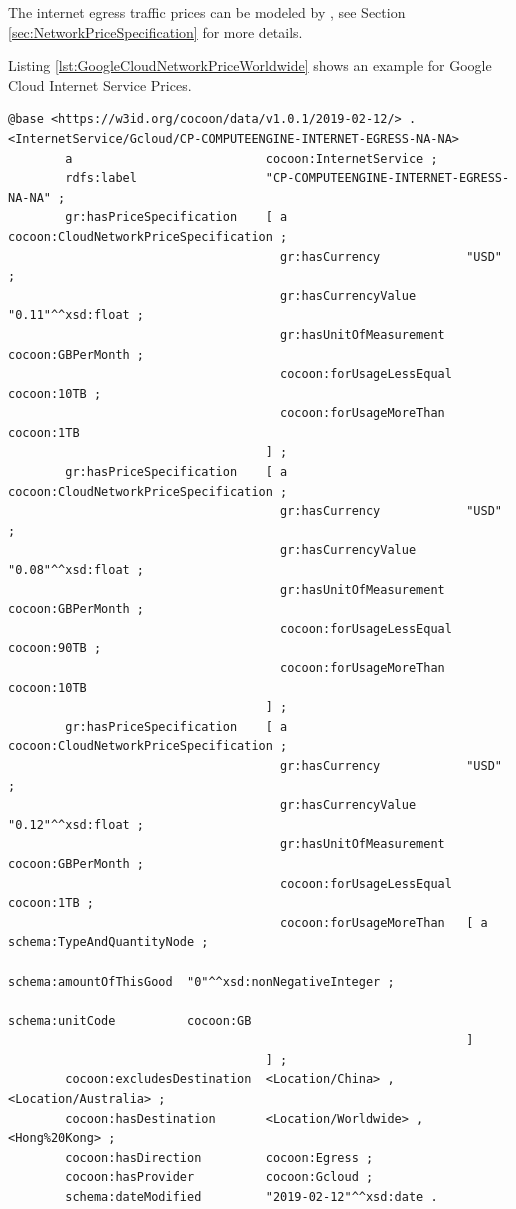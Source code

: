 The internet egress traffic prices can be modeled by , see Section \ref{sec:NetworkPriceSpecification} for more details.

Listing \ref{lst:GoogleCloudNetworkPriceWorldwide} shows an example for Google Cloud Internet Service Prices.

\begin{lstlisting}[caption={Google Cloud Network Price Example: Worldwide Egress},label={lst:GoogleCloudNetworkPriceWorldwide}]
@base <https://w3id.org/cocoon/data/v1.0.1/2019-02-12/> .
<InternetService/Gcloud/CP-COMPUTEENGINE-INTERNET-EGRESS-NA-NA>
        a                           cocoon:InternetService ;
        rdfs:label                  "CP-COMPUTEENGINE-INTERNET-EGRESS-NA-NA" ;
        gr:hasPriceSpecification    [ a                         cocoon:CloudNetworkPriceSpecification ;
                                      gr:hasCurrency            "USD" ;
                                      gr:hasCurrencyValue       "0.11"^^xsd:float ;
                                      gr:hasUnitOfMeasurement   cocoon:GBPerMonth ;
                                      cocoon:forUsageLessEqual  cocoon:10TB ;
                                      cocoon:forUsageMoreThan   cocoon:1TB
                                    ] ;
        gr:hasPriceSpecification    [ a                         cocoon:CloudNetworkPriceSpecification ;
                                      gr:hasCurrency            "USD" ;
                                      gr:hasCurrencyValue       "0.08"^^xsd:float ;
                                      gr:hasUnitOfMeasurement   cocoon:GBPerMonth ;
                                      cocoon:forUsageLessEqual  cocoon:90TB ;
                                      cocoon:forUsageMoreThan   cocoon:10TB
                                    ] ;
        gr:hasPriceSpecification    [ a                         cocoon:CloudNetworkPriceSpecification ;
                                      gr:hasCurrency            "USD" ;
                                      gr:hasCurrencyValue       "0.12"^^xsd:float ;
                                      gr:hasUnitOfMeasurement   cocoon:GBPerMonth ;
                                      cocoon:forUsageLessEqual  cocoon:1TB ;
                                      cocoon:forUsageMoreThan   [ a                        schema:TypeAndQuantityNode ;
                                                                  schema:amountOfThisGood  "0"^^xsd:nonNegativeInteger ;
                                                                  schema:unitCode          cocoon:GB
                                                                ]
                                    ] ;
        cocoon:excludesDestination  <Location/China> , <Location/Australia> ;
        cocoon:hasDestination       <Location/Worldwide> , <Hong%20Kong> ;
        cocoon:hasDirection         cocoon:Egress ;
        cocoon:hasProvider          cocoon:Gcloud ;
        schema:dateModified         "2019-02-12"^^xsd:date .
\end{lstlisting}

